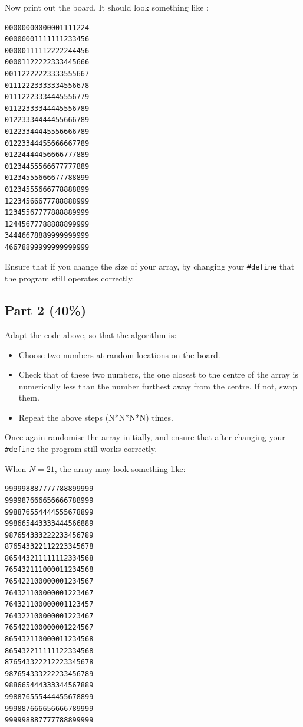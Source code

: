 \begin{appendices}
Now print out the board. It should look something like :
{\small
\begin{verbatim}
00000000000001111224
00000001111111233456
00000111112222244456
00001122222333445666
00112222223333555667
01112223333334556678
01112223334445556779
01122333344445556789
01223334444455666789
01223344445556666789
01223344455666667789
01224444456666777889
01234455566677777889
01234555666677788899
01234555666778888899
12234566677788888999
12345567777888889999
12445677788888899999
34446678889999999999
46678899999999999999
\end{verbatim}
}

Ensure that if you change the size of your array, by changing your \verb^#define^
that the program still operates correctly.

\subsection*{Part 2 (40\%)}
Adapt the code above, so that the algorithm is:
\begin{itemize}
\item Choose two numbers at random locations on the board.
\item Check that of these two numbers, the one closest to the centre of the array
is numerically less than the number furthest away from the centre. If not, swap them.
\item Repeat the above steps (N*N*N*N) times.
\end{itemize}

Once again randomise the array initially, and ensure that after changing your \verb^#define^
the program still works correctly.

When $N=21$, the array may look something like:
{\samepage
{\small
\begin{verbatim}
999998887777788899999
999987666656666788999
998876554444555678899
998665443333444566889
987654333222233456789
876543322112223345678
865443211111112334568
765432111000011234568
765422100000001234567
764321100000001223467
764321100000001123457
764322100000001223467
765422100000001224567
865432110000011234568
865432211111122334568
876543322212223345678
987654333222233456789
988665444333344567889
998876555444455678899
999887666656666789999
999998887777788899999
\end{verbatim}
}
}

\end{appendices}

